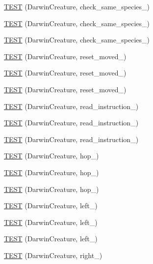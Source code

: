 \begin{DoxyCompactItemize}
\hyperlink{TestDarwin_8c_09_09_a8971527b85ca8f730a6b98238b804dec}{T\-E\-S\-T} (Darwin\-Creature, check\-\_\-same\-\_\-species\-\_)
\item 
\hyperlink{TestDarwin_8c_09_09_accfafe5868230ac622fb854fb0707d33}{T\-E\-S\-T} (Darwin\-Creature, check\-\_\-same\-\_\-species\-\_)
\item 
\hyperlink{TestDarwin_8c_09_09_add3e1bc9dc593f8607207041cafa1381}{T\-E\-S\-T} (Darwin\-Creature, check\-\_\-same\-\_\-species\-\_)
\item 
\hyperlink{TestDarwin_8c_09_09_a3eced763e6cabcd392305aff448e6852}{T\-E\-S\-T} (Darwin\-Creature, reset\-\_\-moved\-\_)
\item 
\hyperlink{TestDarwin_8c_09_09_aa89667721942089bafe0342f4f1e74ac}{T\-E\-S\-T} (Darwin\-Creature, reset\-\_\-moved\-\_)
\item 
\hyperlink{TestDarwin_8c_09_09_a254acf0c7fbcc0c0a2cbab390108efd9}{T\-E\-S\-T} (Darwin\-Creature, reset\-\_\-moved\-\_)
\item 
\hyperlink{TestDarwin_8c_09_09_afb449e4bd544f07bf3033d5ee7c05482}{T\-E\-S\-T} (Darwin\-Creature, read\-\_\-instruction\-\_)
\item 
\hyperlink{TestDarwin_8c_09_09_af19de26fd00f5b412465d4a733fc00a6}{T\-E\-S\-T} (Darwin\-Creature, read\-\_\-instruction\-\_)
\item 
\hyperlink{TestDarwin_8c_09_09_a724ad040c4fad68bc8896003fdc418f5}{T\-E\-S\-T} (Darwin\-Creature, read\-\_\-instruction\-\_)
\item 
\hyperlink{TestDarwin_8c_09_09_a75223ecb73005165017459df221ac053}{T\-E\-S\-T} (Darwin\-Creature, hop\-\_)
\item 
\hyperlink{TestDarwin_8c_09_09_a3ac3fc8b0f398d19784d812ae1583cd2}{T\-E\-S\-T} (Darwin\-Creature, hop\-\_)
\item 
\hyperlink{TestDarwin_8c_09_09_a5343c09dc807f7372f12fc20f17d4130}{T\-E\-S\-T} (Darwin\-Creature, hop\-\_)
\item 
\hyperlink{TestDarwin_8c_09_09_a8759f6d338806ff195abb8bf3a20fe7c}{T\-E\-S\-T} (Darwin\-Creature, left\-\_)
\item 
\hyperlink{TestDarwin_8c_09_09_afeb538f31e80a9da5908cbeb40ad993d}{T\-E\-S\-T} (Darwin\-Creature, left\-\_)
\item 
\hyperlink{TestDarwin_8c_09_09_af6d16011113b014e52e02b45828ac399}{T\-E\-S\-T} (Darwin\-Creature, left\-\_)
\item 
\hyperlink{TestDarwin_8c_09_09_a3469bc43c1d1aa4bdf50b3651d83ee92}{T\-E\-S\-T} (Darwin\-Creature, right\-\_)

\end{DoxyCompactItemize}
